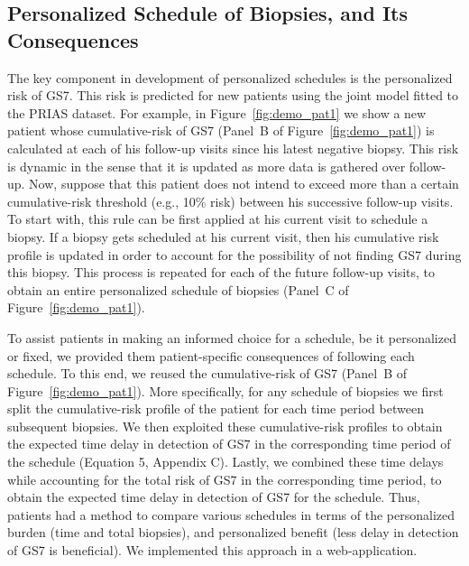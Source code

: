 \subsection{Personalized Schedule of Biopsies, and Its Consequences}
The key component in development of personalized schedules is the personalized risk of GS7. This risk is predicted for new patients using the joint model fitted to the PRIAS dataset. For example, in Figure~\ref{fig:demo_pat1} we show a new patient whose cumulative-risk of GS7 (Panel~B of Figure~\ref{fig:demo_pat1}) is calculated at each of his follow-up visits since his latest negative biopsy. This risk is dynamic in the sense that it is updated as more data is gathered over follow-up. Now, suppose that this patient does not intend to exceed more than a certain cumulative-risk threshold (e.g., 10\% risk) between his successive follow-up visits. To start with, this rule can be first applied at his current visit to schedule a biopsy. If a biopsy gets scheduled at his current visit, then his cumulative risk profile is updated in order to account for the possibility of not finding GS7 during this biopsy. This process is repeated for each of the future follow-up visits, to obtain an entire personalized schedule of biopsies (Panel~C of Figure~\ref{fig:demo_pat1}).

To assist patients in making an informed choice for a schedule, be it personalized or fixed, we provided them patient-specific consequences of following each schedule. To this end, we reused the cumulative-risk of GS7 (Panel~B of Figure~\ref{fig:demo_pat1}). More specifically, for any schedule of biopsies we first split the cumulative-risk profile of the patient for each time period between subsequent biopsies. We then exploited these cumulative-risk profiles to obtain the expected time delay in detection of GS7 in the corresponding time period of the schedule (Equation 5, Appendix C). Lastly, we combined these time delays while accounting for the total risk of GS7 in the corresponding time period, to obtain the expected time delay in detection of GS7 for the schedule. Thus, patients had a method to compare various schedules in terms of the personalized burden (time and total biopsies), and personalized benefit (less delay in detection of GS7 is beneficial). We implemented this approach in a web-application.

